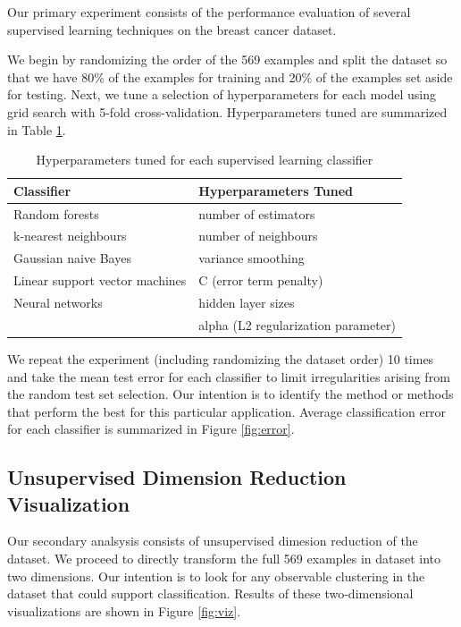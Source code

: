 \documentclass{article}
\begin{document}
Our primary experiment consists of the performance evaluation of several supervised learning techniques on the breast cancer dataset.

We begin by randomizing the order of the 569 examples and split the dataset so that we have 80\% of the examples for training and 20\% of the examples set aside for testing. Next, we tune a selection of hyperparameters for each model using grid search with 5-fold cross-validation. Hyperparameters tuned are summarized in Table \ref{tab:hp}.

\begin{table}[]
	\caption{Hyperparameters tuned for each supervised learning classifier}
	\label{tab:hp}
	\centering
	\begin{tabular}{ll}
		\toprule
		Classifier  			& Hyperparameters Tuned \\
		\midrule
		Random forests 	& number of estimators \\
		k-nearest neighbours   & number of neighbours \\
		Gaussian naive Bayes & variance smoothing \\
		Linear support vector machines & C (error term penalty)\\
		Neural networks & hidden layer sizes \footnotemark \\
		& alpha (L2 regularization parameter) \\
		\bottomrule
		
	\end{tabular}
\end{table}

We repeat the experiment (including randomizing the dataset order) 10 times and take the mean test error for each classifier to limit irregularities arising from the random test set selection. Our intention is to identify the method or methods that perform the best for this particular application. Average classification error for each classifier is summarized in Figure \ref{fig:error}.

\subsection{Unsupervised Dimension Reduction Visualization}

Our secondary analsysis consists of unsupervised dimesion reduction of the dataset. We proceed to directly transform the full 569 examples in dataset into two dimensions. Our intention is to look for any observable clustering in the dataset that could support classification. Results of these two-dimensional visualizations are shown in Figure \ref{fig:viz}.
\end{document}
